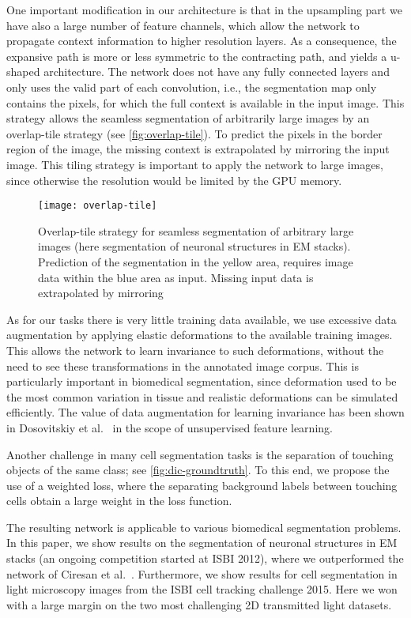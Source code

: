 \documentclass{llncs}
\begin{document}
One important modification in our architecture is that in the upsampling part we have also a large number of feature channels, which allow the network to propagate context information to higher resolution layers. As a consequence, the expansive path is more or less symmetric to the contracting path, and yields a u-shaped architecture. The network does not have any fully connected layers and only uses the valid part of each convolution, i.e., the segmentation map only contains the pixels, for which the full context is available in the input image. This strategy allows the seamless segmentation of arbitrarily large images by an overlap-tile strategy (see \autoref{fig:overlap-tile}). To predict the pixels in the border region of the image, the missing context is extrapolated by mirroring the input image. This tiling strategy is important to apply the network to large images, since otherwise the resolution would be limited by the GPU memory.

\begin{figure}[t]
  \centering
  \texttt{[image: overlap-tile]}
  \caption{Overlap-tile strategy for seamless segmentation of arbitrary large images (here segmentation of neuronal structures in EM stacks). Prediction of the segmentation in the yellow area, requires image data within the blue area as input. Missing input data is extrapolated by mirroring}
  \label{fig:overlap-tile}
\end{figure}

As for our tasks there is very little training data available, we use excessive data augmentation by applying elastic deformations to the available training images. This allows the network to learn invariance to such deformations, without the need to see these transformations in the annotated image corpus. This is particularly important in biomedical segmentation, since deformation used to be the most common variation in tissue and realistic deformations can be simulated efficiently. The value of data augmentation for learning invariance has been shown in Dosovitskiy et al.~\cite{unsupervised} in the scope of unsupervised feature learning.

Another challenge in many cell segmentation tasks is the separation of touching objects of the same class; see \autoref{fig:dic-groundtruth}. To this end, we propose the use of a weighted loss, where the separating background labels between touching cells obtain a large weight in the loss function.

The resulting network is applicable to various biomedical segmentation problems. In this paper, we show results on the segmentation of neuronal structures in EM stacks (an ongoing competition started at ISBI 2012), where we outperformed the network of Ciresan et al.~\cite{schmidhuber12deepneural}. Furthermore, we show results for cell segmentation in light microscopy images from the ISBI cell tracking challenge 2015. Here we won with a large margin on the two most challenging 2D transmitted light datasets.
\end{document}
